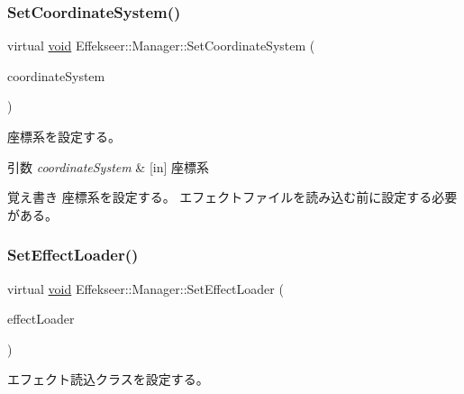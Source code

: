 \subsubsection{\texorpdfstring{Set\+Coordinate\+System()}{SetCoordinateSystem()}}
{\footnotesize\ttfamily virtual \mbox{\hyperlink{namespace_effekseer_ab34c4088e512200cf4c2716f168deb56}{void}} Effekseer\+::\+Manager\+::\+Set\+Coordinate\+System (\begin{DoxyParamCaption}\item[{\mbox{\hyperlink{namespace_effekseer_ac8508f8823c5fcf36aac5d2ddee23765}{Coordinate\+System}}}]{coordinate\+System }\end{DoxyParamCaption})\hspace{0.3cm}{\ttfamily [pure virtual]}}



座標系を設定する。 


\begin{DoxyParams}{引数}
{\em coordinate\+System} & \mbox{[}in\mbox{]} 座標系 \\
\hline
\end{DoxyParams}
\begin{DoxyNote}{覚え書き}
座標系を設定する。 エフェクトファイルを読み込む前に設定する必要がある。 
\end{DoxyNote}
\mbox{\label{class_effekseer_1_1_manager_a1e183d9310c8562279707786e5503f8f}} 
\subsubsection{\texorpdfstring{Set\+Effect\+Loader()}{SetEffectLoader()}}
{\footnotesize\ttfamily virtual \mbox{\hyperlink{namespace_effekseer_ab34c4088e512200cf4c2716f168deb56}{void}} Effekseer\+::\+Manager\+::\+Set\+Effect\+Loader (\begin{DoxyParamCaption}\item[{\mbox{\hyperlink{class_effekseer_1_1_effect_loader}{Effect\+Loader}} $\ast$}]{effect\+Loader }\end{DoxyParamCaption})\hspace{0.3cm}{\ttfamily [pure virtual]}}



エフェクト読込クラスを設定する。 

\mbox{\label{class_effekseer_1_1_manager_a81402561ce17b0d4c681811affbd7340}} 
